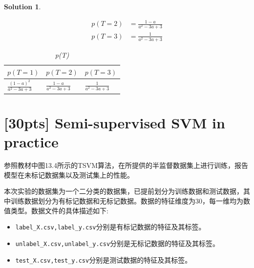 \documentclass[a4paper,UTF8]{article}
\newtheorem*{solution}{Solution}
\numberwithin{equation}{section}
\begin{document}
\begin{solution}
\begin{enumerate}[$(1)$]
\begin{align*}
         	p(T=2)&=\frac{1-a}{a^2-3a+3}\\
         	p(T=3)&=\frac{1}{a^2-3a+3}
         \end{align*}
         \begin{table}
         	\centering
         	\caption{p(T)}
         	\begin{tabular}{|l|l|l|}
         		\hline
         		$p(T=1)$ & $p(T=2)$ & $p(T=3)$ \\ \hline
         		$\frac{(1-a)^2}{a^2-3a+3}$ & $\frac{1-a}{a^2-3a+3}$ & $\frac{1}{a^2-3a+3}$      \\
         		\hline
         	\end{tabular}
         \end{table}\label{table:pT} 
\end{enumerate}
\end{solution}

\section{\textbf{[30pts]} Semi-supervised SVM in practice}
参照教材中图13.4所示的TSVM算法，在所提供的半监督数据集上进行训练，报告模型在未标记数据集以及测试集上的性能。

本次实验的数据集为一个二分类的数据集，已提前划分为训练数据和测试数据，其中训练数据划分为有标记数据和无标记数据。数据的特征维度为30，每一维均为数值类型。数据文件的具体描述如下:
\begin{itemize}
    \item \texttt{label\_X.csv,label\_y.csv}分别是有标记数据的特征及其标签。
    \item \texttt{unlabel\_X.csv,unlabel\_y.csv}分别是无标记数据的特征及其标签。
    \item \texttt{test\_X.csv,test\_y.csv}分别是测试数据的特征及其标签。
\end{itemize}
\end{document}
